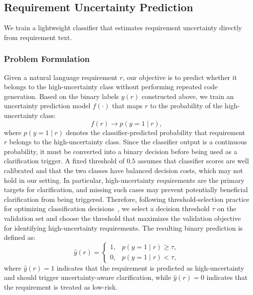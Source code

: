 \subsection{Requirement Uncertainty Prediction}

We train a lightweight classifier that estimates requirement uncertainty directly from requirement text.


\subsubsection{Problem Formulation}
Given a natural language requirement $r$, our objective is to predict whether it belongs to the high-uncertainty class without performing repeated code generation. Based on the binary labels $y(r)$ constructed above, we train an uncertainty prediction model $f(\cdot)$ that maps $r$ to the probability of the high-uncertainty class:
\begin{equation}
\label{eq:uncertaintyPrediction}
f(r) \rightarrow p(y=1 \mid r),
\end{equation}
where $p(y=1 \mid r)$ denotes the classifier-predicted probability that requirement $r$ belongs to the high-uncertainty class. Since the classifier output is a continuous probability, it must be converted into a binary decision before being used as a clarification trigger. A fixed threshold of $0.5$ assumes that classifier scores are well calibrated and that the two classes have balanced decision costs, which may not hold in our setting. In particular, high-uncertainty requirements are the primary targets for clarification, and missing such cases may prevent potentially beneficial clarification from being triggered. Therefore, following threshold-selection practice for optimizing classification decisions~\cite{lipton2014optimal}, we select a decision threshold $\tau$ on the validation set and choose the threshold that maximizes the validation objective for identifying high-uncertainty requirements. The resulting binary prediction is defined as:
\begin{equation}
\label{eq:predictionLabel}
\hat{y}(r)=
\begin{cases}
1, & p(y=1 \mid r) \geq \tau,\\
0, & p(y=1 \mid r) < \tau,
\end{cases}
\end{equation}
where $\hat{y}(r)=1$ indicates that the requirement is predicted as high-uncertainty and should trigger uncertainty-aware clarification, while $\hat{y}(r)=0$ indicates that the requirement is treated as low-risk.


